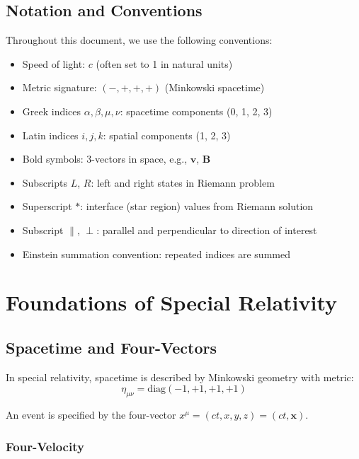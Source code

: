 \documentclass[12pt,a4paper]{article}
\begin{document}
\subsection{Notation and Conventions}

Throughout this document, we use the following conventions:
\begin{itemize}
    \item Speed of light: $c$ (often set to 1 in natural units)
    \item Metric signature: $(-,+,+,+)$ (Minkowski spacetime)
    \item Greek indices $\alpha, \beta, \mu, \nu$: spacetime components (0, 1, 2, 3)
    \item Latin indices $i, j, k$: spatial components (1, 2, 3)
    \item Bold symbols: 3-vectors in space, e.g., $\bm{v}$, $\bm{B}$
    \item Subscripts $L$, $R$: left and right states in Riemann problem
    \item Superscript $*$: interface (star region) values from Riemann solution
    \item Subscript $\parallel$, $\perp$: parallel and perpendicular to direction of interest
    \item Einstein summation convention: repeated indices are summed
\end{itemize}

\section{Foundations of Special Relativity}

\subsection{Spacetime and Four-Vectors}

In special relativity, spacetime is described by Minkowski geometry with metric:
\begin{equation}
\eta_{\mu\nu} = \text{diag}(-1, +1, +1, +1)
\label{eq:minkowski_metric}
\end{equation}

An event is specified by the four-vector $x^\mu = (ct, x, y, z) = (ct, \bm{x})$.

\subsubsection{Four-Velocity}
\end{document}
